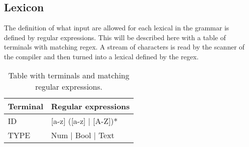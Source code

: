 \subsection{Lexicon}

The definition of what input are allowed for each lexical in the grammar is defined by regular expressions. This will be described here with a table of terminals with matching regex. A stream of characters is read by the scanner of the compiler and then turned into a lexical defined by the regex.

\begin{table}[]
\centering
\label{fig:Lexicon}
\begin{tabular}{|l|l|}
\hline
Terminal & Regular expressions                \\ \hline
ID       & {[}a-z{]} ({[}a-z{]} | {[}A-Z{]})* \\ \hline
TYPE     & Num | Bool | Text                  \\ \hline
\end{tabular}
\caption{Table with terminals and matching regular expressions.}
\end{table}